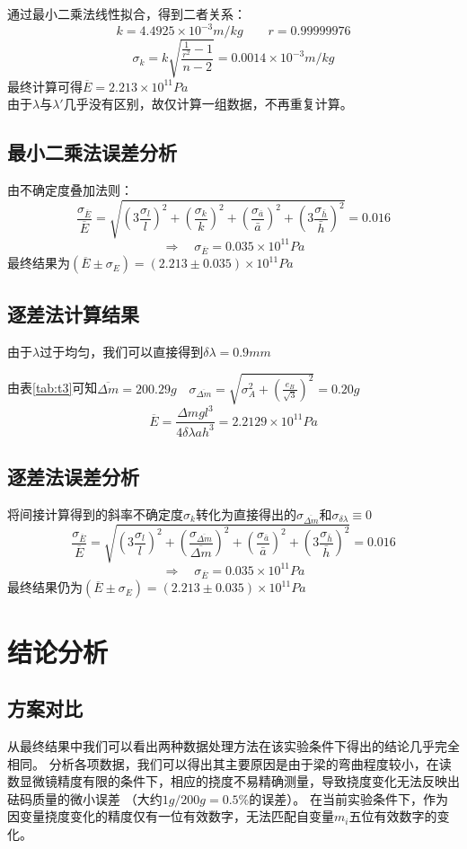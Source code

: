 \documentclass[12pt, a4paper]{ctexart}
\begin{document}
通过最小二乘法线性拟合，得到二者关系：\\
\[
    k = 4.4925\times 10^{-3}m/kg \qquad r = 0.99999976
\]
\[
    \sigma_k = k \sqrt{\frac{\frac1{r^2}-1}{n-2}} = 0.0014\times 10^{-3}m/kg
\]
最终计算可得$\overline{E} = 2.213 \times 10^{11} Pa $\\
由于$\lambda$与$\lambda'$几乎没有区别，故仅计算一组数据，不再重复计算。


\subsection{最小二乘法误差分析}
由不确定度叠加法则：
\[
    \frac{\sigma_{\overline{E}}}{\overline{E}} = \sqrt{(3\frac{\sigma_l}l)^2 + (\frac{\sigma_{k}}{k})^2 + (\frac{\sigma_{\bar{a}}}{\bar{a}})^2 + (3\frac{\sigma_{\bar{h}}}{\bar{h}})^2}
    = 0.016
\]
\[
    \Rightarrow \quad \sigma_{\overline{E}} = 0.035 \times 10^{11}Pa
\]
最终结果为$(\overline{E} \pm \sigma_E) = (2.213 \pm 0.035)\times 10^{11}Pa$

\subsection{逐差法计算结果}
由于$\lambda$过于均匀，我们可以直接得到$\delta \lambda = 0.9mm $

由表\ref{tab:t3}可知$\displaystyle{\overline{\Delta m} = 200.29g \quad \sigma_{\overline{\Delta m}} = \sqrt{\sigma_{A}^2 + (\frac{e_{B}}{\sqrt{3}})^2 } = 0.20g} $
\[
    \overline{E} = \frac{\Delta mgl^3}{4\delta \lambda ah^3} = 2.2129\times 10^{11}Pa
\]

\subsection{逐差法误差分析}
将间接计算得到的斜率不确定度$\sigma_{k}$转化为直接得出的$\sigma_{\overline{\Delta m}}$和$\sigma_{\delta \lambda}\equiv 0$
\[
    \frac{\sigma_{\overline{E}}}{\overline{E}} = \sqrt{(3\frac{\sigma_l}l)^2 + (\frac{\sigma_{\overline{\Delta m}}}{\overline{\Delta m}})^2 + (\frac{\sigma_{\bar{a}}}{\bar{a}})^2 + (3\frac{\sigma_{\bar{h}}}{\bar{h}})^2}
    = 0.016
\]
\[
    \Rightarrow \quad \sigma_{\overline{E}} = 0.035 \times 10^{11}Pa
\]
最终结果仍为$(\overline{E} \pm \sigma_E) = (2.213 \pm 0.035)\times 10^{11}Pa$

\section{结论分析}
\subsection{方案对比}
从最终结果中我们可以看出两种数据处理方法在该实验条件下得出的结论几乎完全相同。
分析各项数据，我们可以得出其主要原因是由于梁的弯曲程度较小，在读数显微镜精度有限的条件下，相应的挠度不易精确测量，导致挠度变化无法反映出砝码质量的微小误差
（大约$1g/200g = 0.5\% $的误差）。
在当前实验条件下，作为因变量挠度变化的精度仅有一位有效数字，无法匹配自变量$m_i$五位有效数字的变化。
\end{document}
